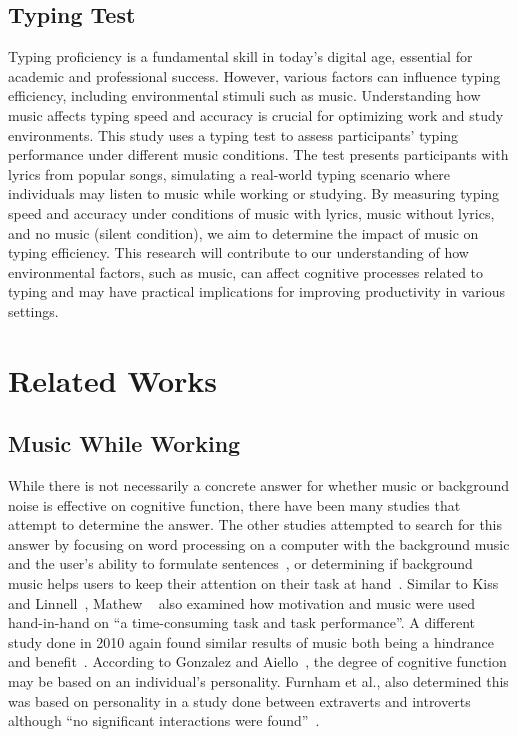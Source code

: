 \documentclass[manuscript, screen, review]{acmart} %
\begin{document}
\subsection{Typing Test}
Typing proficiency is a fundamental skill in today's digital age, essential for academic and professional success. 
However, various factors can influence typing efficiency, including environmental stimuli such as music. Understanding how music affects typing speed and accuracy is crucial for optimizing work and study environments.
This study uses a typing test to assess participants' typing performance under different music conditions. 
The test presents participants with lyrics from popular songs, simulating a real-world typing scenario where individuals may listen to music while working or studying.
By measuring typing speed and accuracy under conditions of music with lyrics, music without lyrics, and no music (silent condition), we aim to determine the impact of music on typing efficiency. 
This research will contribute to our understanding of how environmental factors, such as music, can affect cognitive processes related to typing and may have practical implications for improving productivity in various settings.


\section{Related Works}
\subsection{Music While Working}
While there is not necessarily a concrete answer for whether music or background noise is effective on cognitive function, there have been many
studies that attempt to determine the answer. 
The other studies attempted to search for this answer by focusing on word processing on a computer with the background music and the user's ability to formulate sentences~\cite{ransdell2001141}, or determining if background music helps users to keep their attention on their task at hand~\cite{kiss2021effect}. 
Similar to Kiss and Linnell~\cite{kiss2021effect}, Mathew ~\cite{mathew2022inherently} also examined how motivation and music were used hand-in-hand on ``a time-consuming task and task performance''. 
A different study done in 2010 again found similar results of music both being a hindrance and benefit~\cite{AudioDistractionsAshley}. 
According to Gonzalez and Aiello~\cite{Gonzalez_Aiello_2019}, the degree of cognitive function may be based on an individual's personality. 
Furnham et al., also determined this was based on personality in a study done between extraverts and introverts although ``no significant interactions were found''~\cite{distractingEffectsFurnham}.
\end{document}
